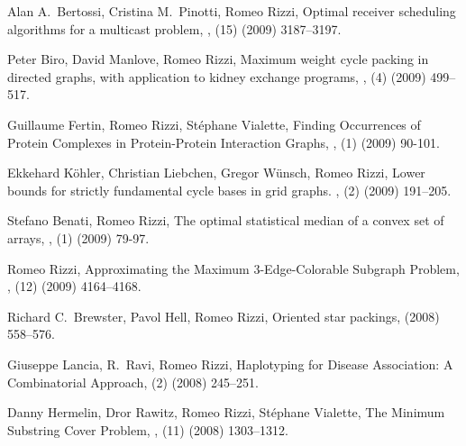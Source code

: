 \begin{etaremune}
  \item {\sc Alan A.~Bertossi, Cristina M.~Pinotti, Romeo Rizzi},
   \newblock  Optimal receiver scheduling algorithms for a multicast problem,
   ,
   (15) (2009) 3187--3197.

  \item {\sc Peter Biro, David Manlove, Romeo Rizzi},
   \newblock   Maximum weight cycle packing in directed graphs, with application to kidney exchange programs,
   ,
   (4) (2009) 499--517.

  \item {\sc Guillaume Fertin, Romeo Rizzi, St\'ephane Vialette},
   \newblock  Finding Occurrences of Protein
              Complexes in Protein-Protein Interaction Graphs,
   ,
   (1) (2009) 90-101.

  \item {\sc Ekkehard K\"ohler, Christian Liebchen, Gregor W\"unsch, Romeo Rizzi},
   \newblock  Lower bounds for strictly fundamental cycle bases in grid graphs.    ,
   (2) (2009) 191--205.

  \item {\sc Stefano Benati, Romeo Rizzi},
   \newblock   The optimal statistical median of a convex set of arrays,
   ,
   (1) (2009) 79-97.

  \item {\sc Romeo Rizzi},
   \newblock   Approximating the Maximum $3$-Edge-Colorable Subgraph Problem,
   ,
   (12) (2009) 4164--4168.

  \item {\sc Richard C.~Brewster, Pavol Hell, Romeo Rizzi},
   \newblock  Oriented star packings,
    (2008) 558--576.

  \item {\sc Giuseppe Lancia, R.~Ravi, Romeo Rizzi},
   \newblock  Haplotyping for Disease Association: A Combinatorial Approach, 
   (2) (2008) 245--251.

  \item {\sc Danny Hermelin, Dror Rawitz, Romeo Rizzi, St\'ephane Vialette},
   \newblock  The Minimum Substring Cover Problem,
   ,
   (11) (2008) 1303--1312.


\end{etaremune}

